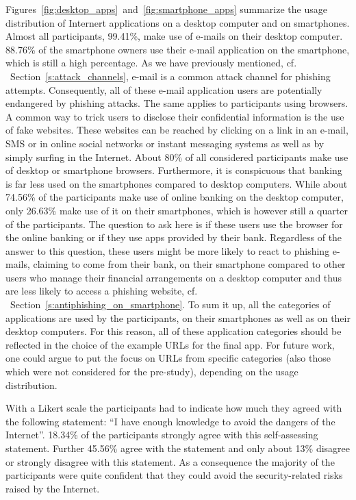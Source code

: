 \begin{description}[leftmargin=0cm]
	
	\item[Usage Distribution of Internet Applications] Figures~\ref{fig:desktop_apps}~and~\ref{fig:smartphone_apps} summarize the usage distribution of Internert applications on a desktop computer and on smartphones.
 Almost all participants, 99.41\%, make use of e-mails on their desktop computer.
 88.76\% of the smartphone owners use their e-mail application on the smartphone, which is still a high percentage.
 As we have previously mentioned, cf.
~Section~\ref{s:attack_channels}, e-mail is a common attack channel for phishing attempts.
 Consequently, all of these e-mail application users are potentially endangered by phishing attacks.
 The same applies to participants using browsers.
 A common way to trick users to disclose their confidential information is the use of fake websites.
 These websites can be reached by clicking on a link in an e-mail, SMS or in online social networks or instant messaging systems as well as by simply surfing in the Internet.
 About 80\% of all considered participants make use of desktop or smartphone browsers.
 Furthermore, it is conspicuous that banking is far less used on the smartphones compared to desktop computers.
 While about 74.56\% of the participants make use of online banking on the desktop computer, only 26.63\% make use of it on their smartphones, which is however still a quarter of the participants.
	The question to ask here is if these users use the browser for the online banking or if they use apps provided by their bank.
 Regardless of the answer to this question, these users might be more likely to react to phishing e-mails, claiming to come from their bank, on their smartphone compared to other users who manage their financial arrangements on a desktop computer and thus are less likely to access a phishing website, cf.
~Section~\ref{s:antiphishing_on_smartphone}. To sum it up, all the categories of applications are used by the participants, on their smartphones as well as on their desktop computers.
 For this reason, all of these application categories should be reflected in the choice of the example URLs for the final app.
 For future work, one could argue to put the focus on URLs from specific categories (also those which were not considered for the pre-study), depending on the usage distribution.


	\item[Self-Assessment - Knowledge to avoid dangers of Internet] With a Likert scale the participants had to indicate how much they agreed with the following statement: ``I have enough knowledge to avoid the dangers of the Internet''. 18.34\% of the participants strongly agree with this self-assessing statement.
 Further 45.56\% agree with the statement and only about 13\% disagree or strongly disagree with this statement.
 As a consequence the majority of the participants were quite confident that they could avoid the security-related risks raised by the Internet.
 

\end{description}
